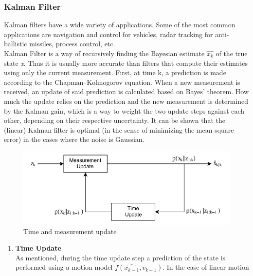 \begin{itemize}
                    \subsubsection{Kalman Filter}
                        Kalman filters have a wide variety of applications. Some of the most common applications are navigation and control for vehicles, radar tracking for anti-ballistic missiles, process control, etc. \\
                        \vspace{3mm}
                        Kalman Filter is a way of recursively finding the Bayesian estimate $\hat{x_k}$ of the true state \emph{x}. Thus it is usually more accurate than filters that compute their estimates using only the current measurement. 
                        First, at time k, a prediction is made according to the Chapman–Kolmogorov equation. When a new measurement is received, an update of said prediction is calculated based on Bayes’ theorem. How much the update relies on 
                        the prediction and the new measurement is determined by the Kalman gain, which is a way to weight the two update steps against each other, depending on their respective uncertainty. It can be shown that the (linear) 
                        Kalman filter is optimal (in the sense of minimizing the mean square error) in the cases where the noise is Gaussian.
                        \begin{figure}[H]
                            \centering
                            \includegraphics[width=0.6\linewidth]{img/time-measurement.png}
                            \caption{Time and measurement update}
                        \end{figure}
                            \begin{enumerate}
                                \item \textbf{Time Update} \\ 
                                    \vspace{3mm}
                                    As mentioned, during the time update step a prediction of the state is performed using a motion model \emph{$f(\hat{x_{k-1}}, v_{k-1})$}. In the case of linear motion 

\end{enumerate}
\end{itemize}
